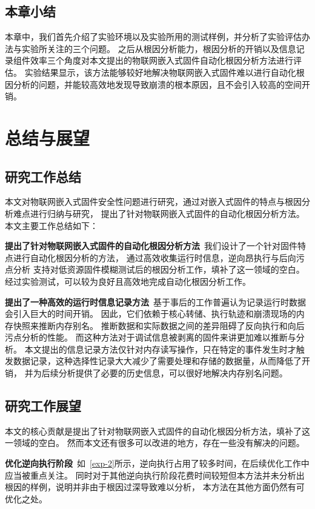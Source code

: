\subsection{本章小结}
本章中，我们首先介绍了实验环境以及实验所用的测试样例，并分析了实验评估办法与实验所关注的三个问题。
之后从根因分析能力，根因分析的开销以及信息记录组件效率三个角度对本文提出的物联网嵌入式固件自动化根因分析方法进行评估。
实验结果显示，该方法能够较好地解决物联网嵌入式固件难以进行自动化根因分析的问题，并能较高效地发现导致崩溃的根本原因，且不会引入较高的空间开销。
\cleardoublepage
\section{总结与展望}        %
\subsection{研究工作总结}
本文对物联网嵌入式固件安全性问题进行研究，通过对嵌入式固件的特点与根因分析难点进行归纳与研究，
提出了针对物联网嵌入式固件的自动化根因分析方法。本文主要工作总结如下：

\textbf{提出了针对物联网嵌入式固件的自动化根因分析方法}\ 我们设计了一个针对固件特点进行自动化根因分析的方法，
通过高效收集运行时信息，逆向昂执行与后向污点分析
支持对低资源固件模糊测试后的根因分析工作，填补了这一领域的空白。
经过实验测试，可以较为良好且高效地完成自动化根因分析工作。

\textbf{提出了一种高效的运行时信息记录方法}\ 基于事后的工作普遍认为记录运行时数据会引入巨大的时间开销。
因此，它们依赖于核心转储、执行轨迹和崩溃现场的内存快照来推断内存别名。
推断数据和实际数据之间的差异阻碍了反向执行和向后污点分析的性能。
而这种方法对于调试信息被剥离的固件来讲更加难以推断与分析。
本文提出的信息记录方法仅针对内存读写操作，只在特定的事件发生时才触发数据记录，这种选择性记录大大减少了需要处理和存储的数据量，从而降低了开销，
并为后续分析提供了必要的历史信息，可以很好地解决内存别名问题。


\subsection{研究工作展望}
本文的核心贡献是提出了针对物联网嵌入式固件的自动化根因分析方法，填补了这一领域的空白。
然而本文还有很多可以改进的地方，存在一些没有解决的问题。


\textbf{优化逆向执行阶段}\ 如~\autoref{exp-2}所示，逆向执行占用了较多时间，在后续优化工作中应当被重点关注。
同时对于其他逆向执行阶段花费时间较短但本方法并未分析出根因的样例，说明并非由于根因过深导致难以分析，
本方法在其他方面仍然有可优化之处。

